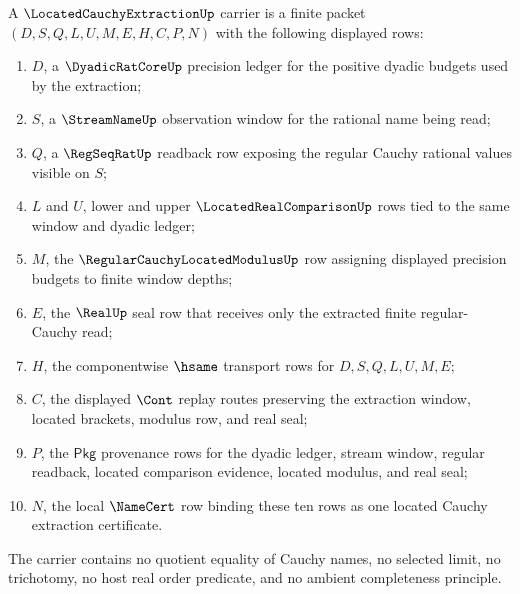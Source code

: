 \begin{definition}
\label{def:located-cauchy-extraction-carrier}
A $\LocatedCauchyExtractionUp$ carrier is a finite packet
$(D,S,Q,L,U,M,E,H,C,P,N)$ with the following displayed rows:
\begin{enumerate}
\item $D$, a $\DyadicRatCoreUp$ precision ledger for the positive dyadic
budgets used by the extraction;
\item $S$, a $\StreamNameUp$ observation window for the rational name being
read;
\item $Q$, a $\RegSeqRatUp$ readback row exposing the regular Cauchy rational
values visible on $S$;
\item $L$ and $U$, lower and upper $\LocatedRealComparisonUp$ rows tied to the
same window and dyadic ledger;
\item $M$, the $\RegularCauchyLocatedModulusUp$ row assigning displayed
precision budgets to finite window depths;
\item $E$, the $\RealUp$ seal row that receives only the extracted finite
regular-Cauchy read;
\item $H$, the componentwise $\hsame$ transport rows for $D,S,Q,L,U,M,E$;
\item $C$, the displayed $\Cont$ replay routes preserving the extraction
window, located brackets, modulus row, and real seal;
\item $P$, the $\mathsf{Pkg}$ provenance rows for the dyadic ledger, stream
window, regular readback, located comparison evidence, located modulus, and
real seal;
\item $N$, the local $\NameCert$ row binding these ten rows as one located
Cauchy extraction certificate.
\end{enumerate}
The carrier contains no quotient equality of Cauchy names, no selected limit,
no trichotomy, no host real order predicate, and no ambient completeness
principle.
\end{definition}

